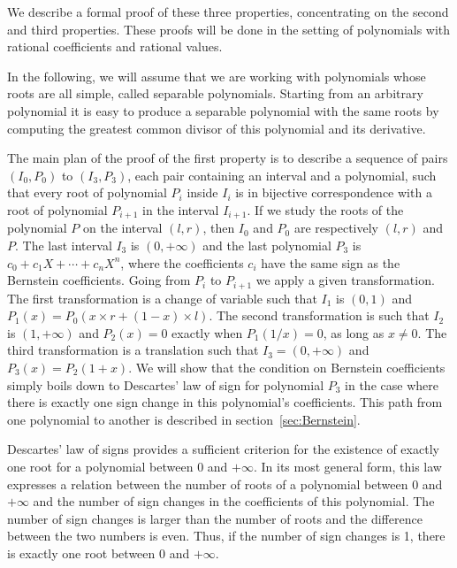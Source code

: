 \documentclass{mscs}
\begin{document}
We describe a formal proof of these three properties,
concentrating on the second and third properties. These proofs will be
done in the setting of polynomials with rational coefficients and
rational values.

In the following, we will assume that we are working with polynomials
whose roots are all simple, called separable polynomials.
Starting from an arbitrary polynomial it is easy to produce a
separable polynomial with the same roots by computing the greatest
common divisor of this polynomial and its derivative.


The main plan of the proof of the first property is to describe a
sequence of pairs \((I_0, P_0)\) to \((I_3, P_3)\), each pair
containing an interval and a polynomial, such that every root of
polynomial \(P_i\) inside \(I_i\) is in bijective correspondence with
a root of polynomial \(P_{i+1}\) in the interval \(I_{i+1}\).  If we
study the roots of the polynomial $P$ on the interval $(l, r)$,
then $I_0$ and $P_0$ are respectively $(l, r)$ and $P$.
The last interval $I_3$ is \((0, +\infty)\) and the last polynomial
$P_3$ is \(c_0 + c_1 X + \cdots + c_n X^n\), where the coefficients
\(c_i\) have the
same sign as the Bernstein coefficients.  Going from \(P_i\) to
\(P_{i+1}\) we apply a given transformation.  The first transformation
is a change of variable such that \(I_1\) is \((0,1)\) and \(P_1(x) =
P_0(x \times r + (1 - x) \times l)\).  The second transformation is such that
\(I_2\) is \((1,+\infty)\) and \(P_2(x) = 0\) exactly when \(P_1(1/x)
= 0\), as long as \(x\neq 0\).  The third transformation is a
translation such that \(I_3 = (0,+\infty)\) and \(P_3(x) = P_2(1+x)\).
We will show that the condition on Bernstein coefficients simply
boils down to Descartes' law of sign \cite{descartes, bpr} for
polynomial \(P_3\) in the
case where there is exactly one sign change in this polynomial's coefficients.
This path from one polynomial to another is described in section~\ref{sec:Bernstein}.

Descartes' law of signs provides a sufficient criterion for the
existence of exactly one root for a polynomial
between 0 and \(+\infty\).  In its
most general form, this law
expresses a relation between the number of roots of a polynomial
between 0 and \(+\infty\) and the number of sign changes in the
coefficients of this polynomial.  The number of sign changes is larger
than the number of roots and the difference between the two numbers is
even.  Thus, if the number of sign changes is 1, there is
exactly one root between 0 and \(+\infty\).
\end{document}
